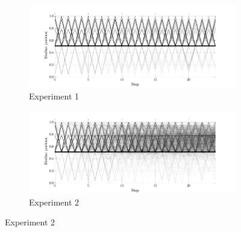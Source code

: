 


\begin{figure}[t!]
    \centering
    \begin{subfigure}[t]{0.49\textwidth}
        \includegraphics[width=\textwidth]{ColdWar/Figures/Exp1_traces}
        \caption{Experiment 1}
    \end{subfigure}
    \begin{subfigure}[t]{0.49\textwidth}
        \includegraphics[width=\textwidth]{ColdWar/Figures/Exp2_traces}
        \caption{Experiment 2}
    \end{subfigure}


\end{figure}
